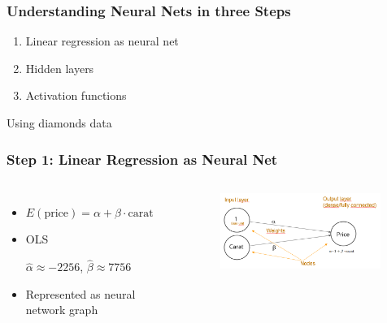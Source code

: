 \documentclass[
    utf8,
    aspectratio=169
]{beamer}  %
\begin{document}
\begin{frame}
	\frametitle{Understanding Neural Nets in three Steps}
	\begin{enumerate}
		\item Linear regression as neural net
		\item Hidden layers
		\item Activation functions
	\end{enumerate}

	\vfill
	
	Using \alert{diamonds} data
\end{frame}

\begin{frame}
	\frametitle{Step 1: Linear Regression as Neural Net}
	\begin{columns}
		\begin{itemize}
			\item $E(\text{price})=\alpha+\beta \cdot \text{carat}$
			\item OLS 
			
			$\hat\alpha \approx -2256$, $\hat\beta \approx 7756$
			\item Represented as neural network graph
		\end{itemize}
		\begin{example}
		\end{example}
		\begin{figure}
		\includegraphics[width=0.98\textwidth]{pics/simple_nn.png}
	\end{figure}
	\end{columns}
\end{frame}
\end{document}
